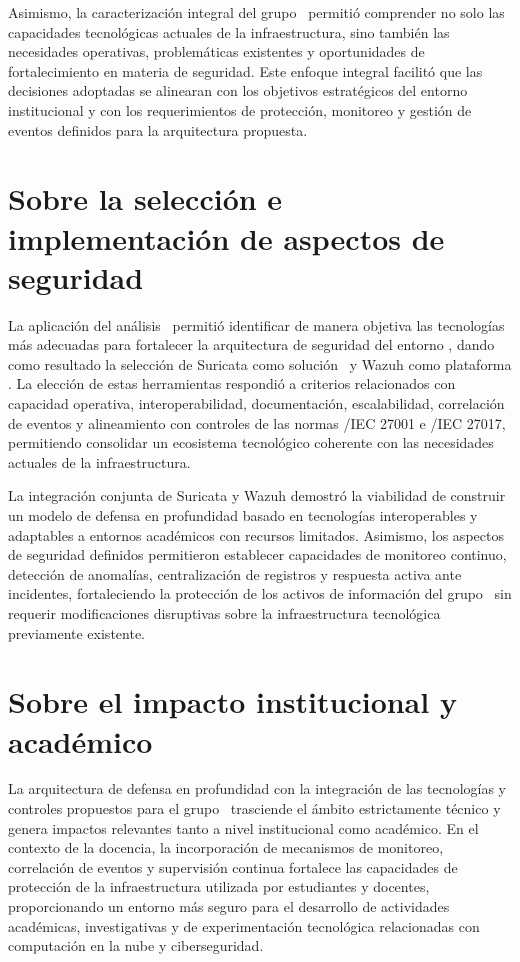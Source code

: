 Asimismo, la caracterización integral del grupo \GRID\ permitió comprender no solo las capacidades tecnológicas actuales de la 
infraestructura, sino también las necesidades operativas, problemáticas existentes y oportunidades de fortalecimiento en materia de 
seguridad. Este enfoque integral facilitó que las decisiones adoptadas se alinearan con los objetivos estratégicos del entorno 
institucional y con los requerimientos de protección, monitoreo y gestión de eventos definidos para la arquitectura propuesta.

\section{Sobre la selección e implementación de aspectos de seguridad}
\noindent

La aplicación del análisis \DAR\ permitió identificar de manera objetiva las tecnologías más adecuadas para fortalecer la arquitectura de 
seguridad del entorno \GRID, dando como resultado la selección de Suricata como solución \IDPS\ y Wazuh como plataforma \SIEM. La elección de 
estas herramientas respondió a criterios relacionados con capacidad operativa, interoperabilidad, documentación, escalabilidad, correlación 
de eventos y alineamiento con controles de las normas \ISO/IEC 27001 e \ISO/IEC 27017, permitiendo consolidar un ecosistema tecnológico 
coherente con las necesidades actuales de la infraestructura.

La integración conjunta de Suricata y Wazuh demostró la viabilidad de construir un modelo de defensa en profundidad basado en tecnologías 
interoperables y adaptables a entornos académicos con recursos limitados. Asimismo, los aspectos de seguridad definidos permitieron 
establecer capacidades de monitoreo continuo, detección de anomalías, centralización de registros y respuesta activa ante incidentes, 
fortaleciendo la protección de los activos de información del grupo \GRID\ sin requerir modificaciones disruptivas sobre la infraestructura 
tecnológica previamente existente.

\section{Sobre el impacto institucional y académico}
\noindent

La arquitectura de defensa en profundidad con la integración de las tecnologías y controles propuestos para el grupo \GRID\ trasciende el 
ámbito estrictamente técnico y genera impactos relevantes tanto a nivel institucional como académico. En el contexto de la docencia, la 
incorporación de mecanismos de monitoreo, correlación de eventos y supervisión continua fortalece las capacidades de protección de la 
infraestructura utilizada por estudiantes y docentes, proporcionando un entorno más seguro para el desarrollo de actividades académicas, 
investigativas y de experimentación tecnológica relacionadas con computación en la nube y ciberseguridad.

